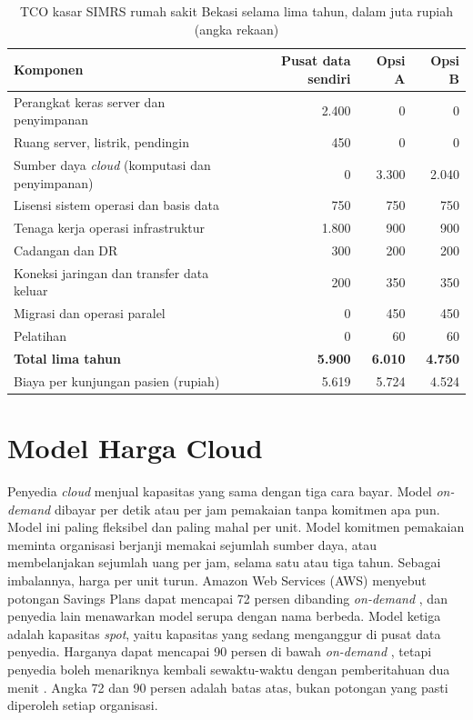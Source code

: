 \begin{table}[!htb]
  \centering
  \caption{TCO kasar SIMRS rumah sakit Bekasi selama lima tahun, dalam juta
           rupiah (angka rekaan)}
  \label{tab:ch03-tco-simrs}
  \footnotesize
  \begin{tabularx}{\textwidth}{>{\raggedright\arraybackslash}X r r r}
    \hline
    \textbf{Komponen} & \textbf{Pusat data sendiri} & \textbf{Opsi A} & \textbf{Opsi B} \\ \hline
    Perangkat keras server dan penyimpanan & 2.400 & 0 & 0 \\ \hline
    Ruang server, listrik, pendingin & 450 & 0 & 0 \\ \hline
    Sumber daya \textit{cloud} (komputasi dan penyimpanan) & 0 & 3.300 & 2.040 \\ \hline
    Lisensi sistem operasi dan basis data & 750 & 750 & 750 \\ \hline
    Tenaga kerja operasi infrastruktur & 1.800 & 900 & 900 \\ \hline
    Cadangan dan DR & 300 & 200 & 200 \\ \hline
    Koneksi jaringan dan transfer data keluar & 200 & 350 & 350 \\ \hline
    Migrasi dan operasi paralel & 0 & 450 & 450 \\ \hline
    Pelatihan & 0 & 60 & 60 \\ \hline
    \textbf{Total lima tahun} & \textbf{5.900} & \textbf{6.010} & \textbf{4.750} \\ \hline
    Biaya per kunjungan pasien (rupiah) & 5.619 & 5.724 & 4.524 \\ \hline
  \end{tabularx}
\end{table}

\section{Model Harga Cloud}

Penyedia \textit{cloud} menjual kapasitas yang sama dengan tiga cara bayar. Model \textit{on-demand}
dibayar per detik atau per jam pemakaian tanpa komitmen apa pun. Model ini paling fleksibel dan
paling mahal per unit. Model komitmen pemakaian meminta organisasi berjanji memakai sejumlah sumber
daya, atau membelanjakan sejumlah uang per jam, selama satu atau tiga tahun. Sebagai imbalannya,
harga per unit turun. Amazon Web Services (AWS) menyebut potongan Savings Plans dapat mencapai 72
persen dibanding \textit{on-demand} \cite{c03-aws-savingsplans}, dan penyedia lain menawarkan model
serupa dengan nama berbeda. Model ketiga adalah kapasitas \textit{spot}, yaitu kapasitas yang sedang
menganggur di pusat data penyedia. Harganya dapat mencapai 90 persen di bawah \textit{on-demand}
\cite{c03-aws-spot}, tetapi penyedia boleh menariknya kembali sewaktu-waktu dengan pemberitahuan dua
menit \cite{c03-aws-spot-interupsi}. Angka 72 dan 90 persen adalah batas atas, bukan potongan yang
pasti diperoleh setiap organisasi.

